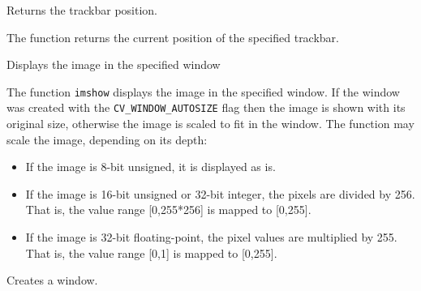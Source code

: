 Returns the trackbar position.

\begin{description}
\end{description}

The function returns the current position of the specified trackbar.


Displays the image in the specified window

\begin{description}
\end{description}

The function \texttt{imshow} displays the image in the specified window. If the window was created with the \texttt{CV\_WINDOW\_AUTOSIZE} flag then the image is shown with its original size, otherwise the image is scaled to fit in the window. The function may scale the image, depending on its depth:
\begin{itemize}
    \item If the image is 8-bit unsigned, it is displayed as is.
    \item If the image is 16-bit unsigned or 32-bit integer, the pixels are divided by 256. That is, the value range [0,255*256] is mapped to [0,255].
    \item If the image is 32-bit floating-point, the pixel values are multiplied by 255. That is, the value range [0,1] is mapped to [0,255].
\end{itemize}


Creates a window.

